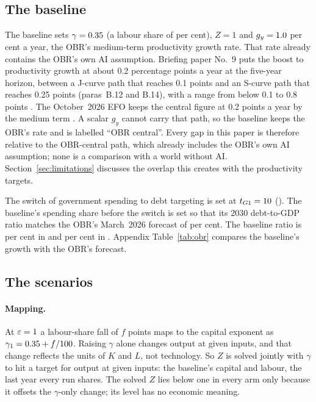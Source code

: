 \subsection{The baseline}
\label{sec:baseline}

The baseline sets $\gamma = 0.35{}$ (a labour share of \genLabourShareBase{} per cent), $Z = 1$ and $g_y = 1.0{}$ per cent a year, the OBR's medium-term productivity growth rate. That rate already contains the OBR's own AI assumption. Briefing paper No.~9 puts the boost to productivity growth at about 0.2 percentage points a year at the five-year horizon, between a J-curve path that reaches 0.1 points and an S-curve path that reaches 0.25 points (paras~B.12 and B.14), with a range from below 0.1 to 0.8 points \citep{obr2025bp9,obr2026frs}. The October~2026 EFO keeps the central figure at 0.2 points a year by the medium term \citep[para~1.27]{obr2026efooctrep}. A scalar $g_y$ cannot carry that path, so the baseline keeps the OBR's rate and is labelled ``OBR central''. Every gap in this paper is therefore relative to the OBR-central path, which already includes the OBR's own AI assumption; none is a comparison with a world without AI. Section~\ref{sec:limitations} discusses the overlap this creates with the productivity targets.

The switch of government spending to debt targeting is set at $t_{G1} = 10{}$ (\genDebtRuleYear{}). The baseline's spending share before the switch is set so that its 2030 debt-to-GDP ratio matches the OBR's March~2026 forecast of \genObrDebtThirtyPct{} per cent. The baseline ratio is \genBaseDebtGdpThirtyOneCentral{} per cent in \genHeadYear{} and \genBaseDebtGdpThirtySixCentral{} per cent in \genDebtRuleYear{}. Appendix Table~\ref{tab:obr} compares the baseline's growth with the OBR's forecast.

\subsection{The scenarios}
\label{sec:calibration}

\paragraph{Mapping.} At $\varepsilon = 1{}$ a labour-share fall of $f$ points maps to the capital exponent as $\gamma_1 = 0.35{} + f/100$. Raising $\gamma$ alone changes output at given inputs, and that change reflects the units of $K$ and $L$, not technology. So $Z$ is solved jointly with $\gamma$ to hit a target for output at given inputs: the baseline's \genRampZeroYear{} capital and labour, the last year every run shares. The solved $Z$ lies below one in every arm only because it offsets the $\gamma$-only change; its level has no economic meaning.


